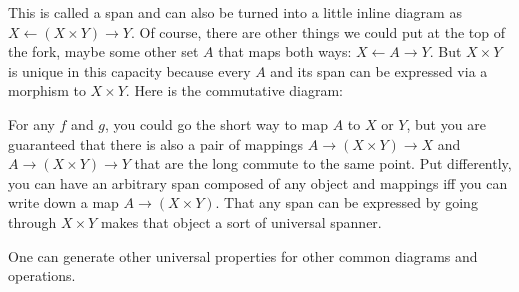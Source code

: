 \documentclass[11pt]{article}
\begin{document}
This is called a span and can also be turned into a little inline diagram as
$X \leftarrow (X\times Y) \rightarrow Y$.
Of course, there are other things we could put at the top of the fork, maybe some other
set $A$ that maps both ways: $X \leftarrow A \rightarrow Y$.
But $X\times Y$ is unique in this capacity because every $A$ and its span can be expressed
via a morphism to $X\times Y$. Here is the commutative diagram:


For any $f$ and $g$, you could go the short way to map $A$ to $X$ or $Y$, but you are
guaranteed that there is also a pair of mappings $A\to (X\times Y) \to X$ and $A\to
(X\times Y) \to Y$ that are
the long commute to the same point.  Put differently, you can have an arbitrary
span composed of any object and mappings iff you can write down a map $A\to (X\times
Y)$. That any span can be expressed by going through $X\times Y$ makes that object a
sort of universal spanner.

One can generate other universal properties for other common diagrams and operations.

\nocite{awodey:category}
\nocite{riehl:category}


\end{document}
